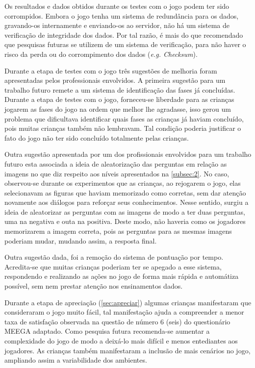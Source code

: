Os resultados e dados obtidos durante os testes com o jogo podem ter sido corrompidos. Embora o jogo tenha um sistema de redundância para os dados, gravando-os internamente e enviando-os ao servidor, não há um sistema de verificação de integridade dos dados. Por tal razão, é mais do que recomendado que pesquisas futuras se utilizem de um sistema de verificação, para não haver o risco da perda ou do corrompimento dos dados (\textit{e.g. Checksum}).


Durante a etapa de testes com o jogo três sugestões de melhoria foram apresentadas pelos professionais envolvidos. A primeira sugestão para um trabalho futuro remete a um sistema de identificação das fases já concluídas. Durante a etapa de testes com o jogo, forneceu-se liberdade para as crianças jogarem as fases do jogo na ordem que melhor lhe agradasse, isso gerou um problema que dificultava identificar quais fases as crianças já haviam concluído, pois muitas crianças também não lembravam. Tal condição poderia justificar o fato do jogo não ter sido concluído totalmente pelas crianças. 

Outra sugestão apresentada por um dos profissionais envolvidos para um trabalho futuro esta associada a ideia de aleatorização das perguntas em relação as imagens no que diz respeito aos níveis apresentados na \autoref{subsec:2}. No caso, observou-se durante os experimentos que as crianças, ao rejogarem o jogo, elas selecionavam as figuras que haviam memorizado como corretas, sem dar atenção novamente aos diálogos para reforçar seus conhecimentos. Nesse sentido, surgiu a ideia de aleatorizar as perguntas com as imagens de modo a ter duas perguntas, uma na negativa e outa na positiva. Deste modo, não haveria como os jogadores memorizarem a imagem correta, pois as perguntas para as mesmas imagens poderiam mudar, mudando assim, a resposta final. 

Outra sugestão dada, foi a remoção do sistema de pontuação por tempo. Acredita-se que muitas crianças poderiam ter se apegado a esse sistema, respondendo e realizando as ações no jogo de forma mais rápida e automátiza possível, sem nem prestar atenção nos ensinamentos dados. 

\newpage

Durante a etapa de apreciação (\autoref{sec:apreciar}) algumas crianças manifestaram que consideraram o jogo muito fácil, tal manifestação ajuda a compreender a menor taxa de satisfação observada na questão de número 6 (seis) do questionário \ac{MEEGA} adaptado. Como pesquisa futura recomenda-se aumentar a complexidade do jogo de modo a deixá-lo mais difícil e menos entediantes aos jogadores. As crianças também manifestaram a inclusão de mais cenários no jogo, ampliando assim a variabilidade dos ambientes. 

